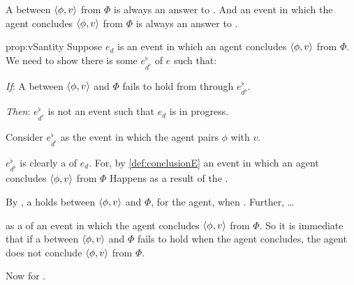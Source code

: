 \begin{note}
  \begin{proposition}
    \label{prop:vSantity}
    A \ros{} between \(\langle \phi, v \rangle\) from \(\Phi\) is always an answer to \qWhyV{}.
    And an event in which the agent concludes \(\langle \phi, v \rangle\) from \(\Phi\) is always an answer to \qHowV{}.
  \end{proposition}

  \begin{argument}{prop:vSantity}
    \color{green}
    Suppose \(e_{d}\) is an event in which an agent concludes \(\langle \phi, v \rangle\) from \(\Phi\).
    We need to show there is some  \(e^{\flat}_{d^{\flat}}\) of \(e\) such that:
    \begin{itenum}
    \item[\emph{If}:]
      A  between \(\langle \phi, v \rangle\) and \(\Phi\) fails to hold from  through \(e^{\flat}_{d^{\flat}}\).
    \item[\emph{Then}:]
      \(e^{\flat}_{d^{\flat}}\) is not an event such that \(e_{d}\) is in progress.
    \end{itenum}
    Consider \(e^{\flat}_{d^{\flat}}\) as the event in which the agent pairs \(\phi\) with \(v\).

    \(e^{\flat}_{d^{\flat}}\) is clearly a \se{} of \(e_{d}\).
    For, by \autoref{def:conclusionE} an event in which an agent concludes \(\langle \phi, v \rangle\) from \(\Phi\)
    {
      \color{green}
      Happens as a result of the \evalN{}.
    }

    By \supportI{}, a \ros{} holds between \(\langle \phi, v \rangle\) and \(\Phi\), for the agent, when .
    Further, \dots

    as a  of an event in which the agent concludes \(\langle \phi, v \rangle\) from \(\Phi\).
    So it is immediate that if a \ros{} between \(\langle \phi, v \rangle\) and \(\Phi\) fails to hold when the agent concludes, the agent does not conclude \(\langle \phi, v \rangle\) from \(\Phi\).
    \medskip

    Now for \qHowV{}.

  \end{argument}
\end{note}


